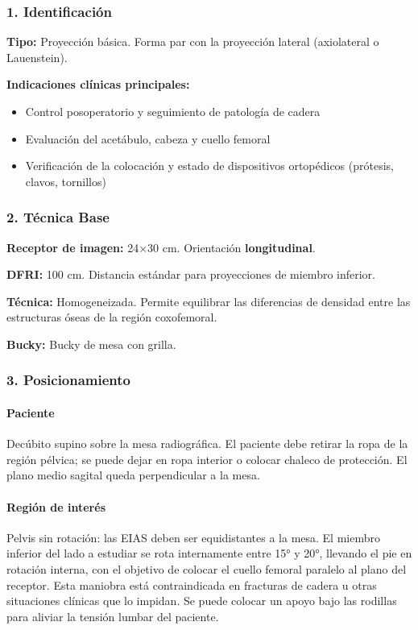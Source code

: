 	\subsubsection*{1. Identificación}
	
	\textbf{Tipo:} Proyección básica. Forma par con la proyección lateral (axiolateral o Lauenstein).
	
	\textbf{Indicaciones clínicas principales:}
	\begin{itemize}
		\item Control posoperatorio y seguimiento de patología de cadera
		\item Evaluación del acetábulo, cabeza y cuello femoral
		\item Verificación de la colocación y estado de dispositivos ortopédicos (prótesis, clavos, tornillos)
	\end{itemize}
	
	\subsubsection*{2. Técnica Base}
	
	\textbf{Receptor de imagen:} 24×30 cm. Orientación \textbf{longitudinal}.
	
	\textbf{DFRI:} 100 cm. Distancia estándar para proyecciones de miembro inferior.
	
	\textbf{Técnica:} Homogeneizada. Permite equilibrar las diferencias de densidad entre las estructuras óseas de la región coxofemoral.
	
	\textbf{Bucky:} Bucky de mesa con grilla.
	
	\subsubsection*{3. Posicionamiento}
	
	\paragraph{Paciente}
	Decúbito supino sobre la mesa radiográfica. El paciente debe retirar la ropa de la región pélvica; se puede dejar en ropa interior o colocar chaleco de protección. El plano medio sagital queda perpendicular a la mesa.
	
	\paragraph{Región de interés}
	Pelvis sin rotación: las EIAS deben ser equidistantes a la mesa. El miembro inferior del lado a estudiar se rota internamente entre 15° y 20°, llevando el pie en rotación interna, con el objetivo de colocar el cuello femoral paralelo al plano del receptor. Esta maniobra está contraindicada en fracturas de cadera u otras situaciones clínicas que lo impidan. Se puede colocar un apoyo bajo las rodillas para aliviar la tensión lumbar del paciente.
	
